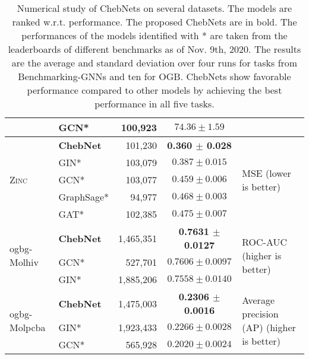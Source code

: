 \documentclass[letterpaper]{article} \usepackage{aaai21}  \usepackage{times}  \usepackage{helvet} \usepackage{courier}  \usepackage[hyphens]{url}  \usepackage{graphicx} \usepackage{natbib}  \usepackage{caption} \frenchspacing  \setlength{\pdfpagewidth}{8.5in}  \setlength{\pdfpageheight}{11in}
\begin{document}
\begin{table*}[ht!]
\begin{tabular}{@{}llrcl@{}}
                             & GCN*       & 100,923       & $74.36 \pm 1.59  $                             &                                                       \\ \midrule
\multirow{5}{*}{\textsc{ Zinc} } & \textbf{ChebNet}   & 101,230       & \textbf{0.360  $\pm$ 0.028}   &         \multirow{5}{*}{MSE (lower is better)}                \\
                              &  GIN*       & 103,079       & $ 0.387 \pm 0.015$       &                                                   \\
                             & GCN*       & 103,077       & $0.459 \pm 0.006$                             &                                                       \\
                             & GraphSage* & 94,977        & $0.468 \pm 0.003$                             &                                                       \\
                             & GAT*       & 102,385        & $0.475 \pm 0.007$                            &                                                       \\ \midrule
\multirow{3}{*}{ogbg-Molhiv} & \textbf{ChebNet}   & 1,465,351    & \textbf{0.7631 $\pm$ 0.0127} & \multirow{3}{*}{ROC-AUC (higher is better)}           \\
                             & GCN*       & 527,701       & $0.7606 \pm 0.0097$                           &                                                       \\
                             & GIN*       & 1,885,206     & $ 0.7558 \pm 0.0140$                          &                                                       \\ \midrule
\multirow{3}{*}{ogbg-Molpcba} & \textbf{ChebNet} & 1,475,003 & \textbf{0.2306 $\pm$ 0.0016} & \multirow{3}{*}{Average precision (AP) (higher is better)} \\
                             & GIN*       & 1,923,433     & $0.2266 \pm 0.0028$                           &                                                       \\
                             & GCN*       & 565,928       & $0.2020 \pm 0.0024$                           &                                                       \\
                             \bottomrule
\end{tabular}
\caption{Numerical study of ChebNets on several datasets. The models are ranked w.r.t. performance. The proposed ChebNets are in bold. The performances of the models identified with * are taken from the leaderboards of different benchmarks as of Nov. 9th, 2020. The results are the average and standard deviation over four runs for tasks from Benchmarking-GNNs and ten for OGB. ChebNets show favorable performance compared to other models by achieving the best performance in all five tasks.}
\label{table:summary}
\end{table*}
\end{document}
